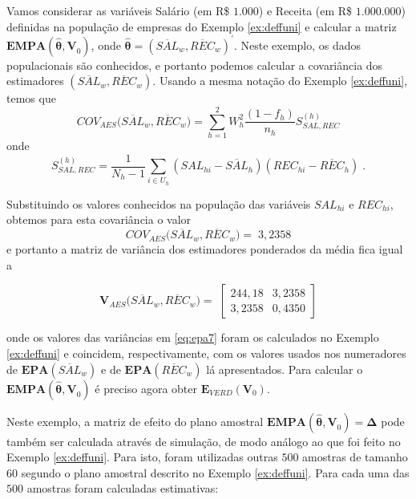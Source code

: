\documentclass[]{book}
\numberwithin{example}{chapter}
\numberwithin{remark}{chapter}
\numberwithin{definition}{chapter}
\begin{document}
Vamos considerar as variáveis Salário (em R\$ \(1.000\)) e Receita (em
R\$ \(1.000.000\)) definidas na população de empresas do Exemplo
\ref{ex:deffuni} e calcular a matriz
\(\mathbf{EMPA}\left( \mathbf{\hat{\theta},V}_{0}\right)\), onde
\(\mathbf{\hat{\theta}=}\left( \overline{SAL}_{w},\overline{REC}_{w}\right) ^{\prime }\).
Neste exemplo, os dados populacionais são conhecidos, e portanto podemos
calcular a covariância dos estimadores
\(\left( \overline{SAL}_{w},\overline{REC}_{w}\right)\). Usando a mesma
notação do Exemplo \ref{ex:deffuni}, temos que \[
COV_{AES}(\overline{SAL}_{w},\overline{REC}_{w}\mathbf{)=}\sum\limits_{h=1}^{2}W_{h}^{2}\frac{\left( 1-f_{h}\right) }{n_{h}}S_{SAL,REC}^{\left( h\right) } 
\] onde \[
S_{SAL,REC}^{\left( h\right) }=\frac{1}{N_{h}-1}\sum\limits_{i\in
U_{h}}\left( SAL_{hi}-\overline{SAL}_{h}\right) \left( REC_{hi}-\overline{REC
}_{h}\right) \;. 
\]

Substituindo os valores conhecidos na população das variáveis
\(SAL_{hi}\) e \(REC_{hi}\), obtemos para esta covariância o valor \[
COV_{AES}(\overline{SAL}_{w},\overline{REC}_{w}\mathbf{)=\;}3,2358
\] e portanto a matriz de variância dos estimadores ponderados da média
fica igual a

\begin{equation}
\mathbf{V}_{AES}(\overline{SAL}_{w},\overline{REC}_{w}\mathbf{)=\;}
\left[ \begin{array}{rr}
244,18 & 3,2358 \\ 
3,2358 & 0,4350
\end{array}
\right]   \label{eq:epa7}
\end{equation}

onde os valores das variâncias em \eqref{eq:epa7} foram os calculados no
Exemplo \ref{ex:deffuni} e coincidem, respectivamente, com os valores
usados nos numeradores de
\(\mathbf{EPA}\left( \overline{SAL}_{w}\right)\) e de
\(\mathbf{EPA}\left( \overline{REC}_{w}\right)\) lá apresentados. Para
calcular o \(\mathbf{EMPA}(\mathbf{\hat{\theta},V}_{0})\) é preciso
agora obter \(\mathbf{E}_{VERD}\left(\mathbf{V}_{0}\right)\).

Neste exemplo, a matriz de efeito do plano amostral
\(\mathbf{EMPA}(\mathbf{\hat{\theta},V}_{0})=\mathbf{\Delta }\) pode
também ser calculada através de simulação, de modo análogo ao que foi
feito no Exemplo \ref{ex:deffuni}. Para isto, foram utilizadas outras
\(500\) amostras de tamanho \(60\) segundo o plano amostral descrito no
Exemplo \ref{ex:deffuni}. Para cada uma das \(500\) amostras foram
calculadas estimativas:
\end{document}
